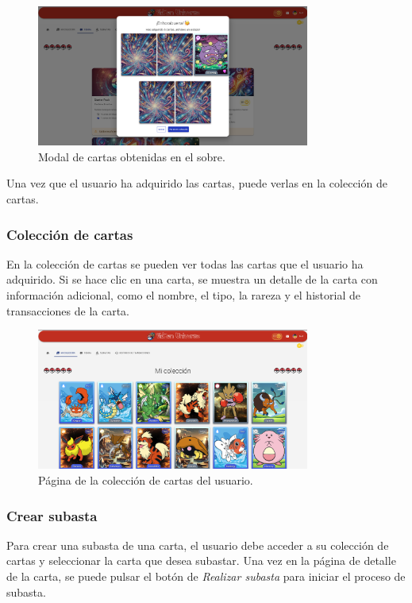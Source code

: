 \begin{figure}[H]
    \centering
    \includegraphics[width=0.8\textwidth]{figures/6-Analisis/6-Interfaz/interfaz/compra_sobre.png}
    \caption{Modal de cartas obtenidas en el sobre.}
    \label{fig:m-interfaz-sobre-comprado}
\end{figure}

Una vez que el usuario ha adquirido las cartas, puede verlas en la colección de cartas.


\subsubsection{Colección de cartas}
En la colección de cartas se pueden ver todas las cartas que el usuario ha adquirido.
Si se hace clic en una carta, se muestra un detalle de la carta con información adicional, como el nombre, el tipo, la rareza y
el historial de transacciones de la carta.

\begin{figure}[H]
    \centering
    \includegraphics[width=0.8\textwidth]{figures/6-Analisis/6-Interfaz/interfaz/coleccion.png}
    \caption{Página de la colección de cartas del usuario.}
    \label{fig:m-interfaz-coleccion}
\end{figure}


\subsubsection{Crear subasta}
Para crear una subasta de una carta, el usuario debe acceder a su colección de cartas y seleccionar la carta que desea subastar.
Una vez en la página de detalle de la carta, se puede pulsar el botón de \textit{Realizar subasta} para iniciar el proceso de subasta.

